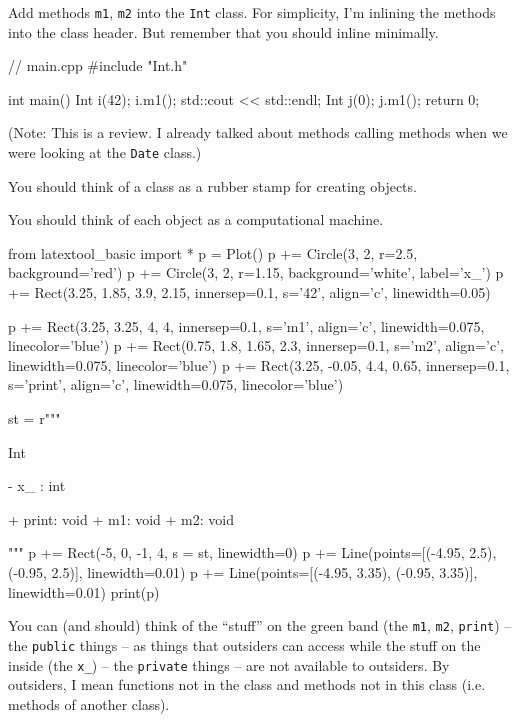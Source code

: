 Add methods \texttt{m1}, \texttt{m2} into the \texttt{Int} class. For
simplicity, I'm inlining the methods into the class header. But remember
that you should inline minimally.

\begin{consolethree}[escapeinside=||]
// Int.h
...
class Int
{
public:
    ...
    void m1()
    {
        std::cout << "m1:" << x << "\n";
        
        ||
    }
    void m2()
    {
        std::cout << "m2:" << x << "\n";
    }
    ...
\end{consolethree}

\begin{consolethree}[escapeinside=||]
// main.cpp
#include "Int.h"

int main()
{
    Int i(42);
    i.m1();
    std::cout << std::endl;
    Int j(0);
    j.m1();
    return 0;
}
\end{consolethree}

(Note: This is a review. I already talked about methods calling methods
when we were looking at the \texttt{Date} class.)


\newpage{}

You should think of a class as a rubber stamp for creating objects.

You should think of each object as a computational machine.

\begin{python}
from latextool_basic import *
p = Plot()
p += Circle(3, 2, r=2.5, background='red')
p += Circle(3, 2, r=1.15, background='white', label='x\_')
p += Rect(3.25, 1.85, 3.9, 2.15, innersep=0.1, s='42', align='c', linewidth=0.05)

p += Rect(3.25, 3.25, 4, 4, innersep=0.1, s='m1', align='c', linewidth=0.075, linecolor='blue')
p += Rect(0.75, 1.8, 1.65, 2.3, innersep=0.1, s='m2', align='c', linewidth=0.075, linecolor='blue')
p += Rect(3.25, -0.05, 4.4, 0.65, innersep=0.1, s='print', align='c', linewidth=0.075, linecolor='blue')

st = r"""
\begin{consolethree}
Int

- x_  :  int

+ print: void
+ m1: void
+ m2: void
\end{consolethree}
"""
p += Rect(-5, 0, -1, 4, s = st, linewidth=0)
p += Line(points=[(-4.95, 2.5), (-0.95, 2.5)], linewidth=0.01)
p += Line(points=[(-4.95, 3.35), (-0.95, 3.35)], linewidth=0.01)
print(p)
\end{python}
You can (and should) think of the ``stuff'' on the green band (the
\texttt{m1}, \texttt{m2}, \texttt{print}) -- the \texttt{public} things -- as
things that outsiders can access while the stuff on the inside (the
\texttt{x\_}) -- the \texttt{private} things -- are not available to
outsiders. By outsiders, I mean functions not in the class and methods
not in this class (i.e. methods of another class).


